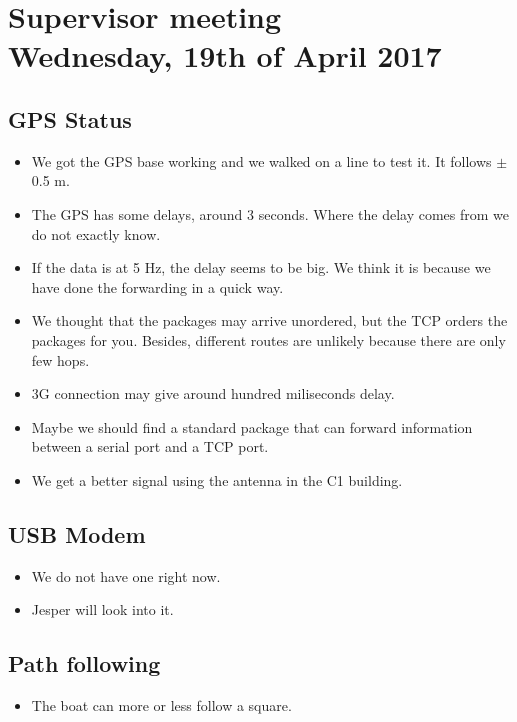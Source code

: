 
\renewcommand{\vec}[1]{\boldsymbol{\mathbf{#1}}}


\section*{Supervisor meeting\\ \small Wednesday, 19th of April 2017}

\subsection{GPS Status}
\begin{itemize}
    \item We got the GPS base working and we walked on a line to test it. It follows $\pm$0.5 m.
    \item The GPS has some delays, around 3 seconds. Where the delay comes from we do not exactly know.
    \item If the data is at 5 Hz, the delay seems to be big. We think it is because we have done the forwarding in a quick way. 
    \item We thought that the packages may arrive unordered, but the TCP orders the packages for you. Besides, different routes are unlikely because there are only few hops.
    \item 3G connection may give around hundred miliseconds delay.
    \item Maybe we should find a standard package that can forward information between a serial port and a TCP port.
    \item We get a better signal using the antenna in the C1 building.
\end{itemize}
\subsection{USB Modem}
\begin{itemize}
    \item We do not have one right now.
    \item Jesper will look into it. 
\end{itemize}
\subsection{Path following}
\begin{itemize}
	\item The boat can more or less follow a square.
\end{itemize}
